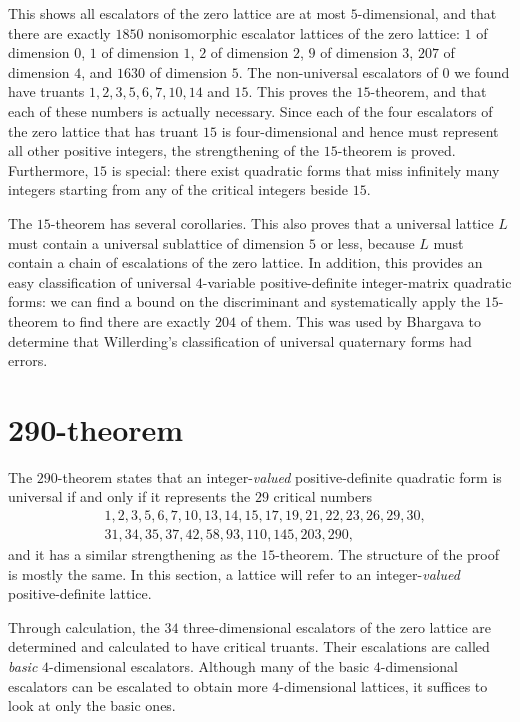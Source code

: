 \documentclass{article}
\begin{document}
This shows all escalators of the zero lattice are at most $5$-dimensional, and that there are exactly $1850$ nonisomorphic escalator lattices of the zero lattice: $1$ of dimension $0$, $1$ of dimension $1$, $2$ of dimension $2$, $9$ of dimension $3$, $207$ of dimension $4$, and $1630$ of dimension $5$. The non-universal escalators of $0$ we found have truants $1, 2, 3, 5, 6, 7, 10, 14$ and $15$. This proves the $15$-theorem, and that each of these numbers is actually necessary. Since each of the four escalators of the zero lattice that has truant $15$ is four-dimensional and hence must represent all other positive integers, the strengthening of the $15$-theorem is proved. Furthermore, $15$ is special: there exist quadratic forms that miss infinitely many integers starting from any of the critical integers beside $15$.

The $15$-theorem has several corollaries. This also proves that a universal lattice $L$ must contain a universal sublattice of dimension $5$ or less, because $L$ must contain a chain of escalations of the zero lattice. In addition, this provides an easy classification of universal $4$-variable positive-definite integer-matrix quadratic forms: we can find a bound on the discriminant and systematically apply the $15$-theorem to find there are exactly $204$ of them. This was used by Bhargava to determine that Willerding's classification of universal quaternary forms had errors.

\section{290-theorem}
The $290$-theorem \cite{twoninety} states that an integer-\emph{valued} positive-definite quadratic form is universal if and only if it represents the $29$ critical numbers
\[\begin{split}
    &1,2,3,5,6,7,10,13,14,15,17,19,21,22,23,26,29,30, \\
    &31,34,35,37,42,58,93,110,145,203,290,
\end{split}\] %
and it has a similar strengthening as the $15$-theorem.
The structure of the proof is mostly the same.
In this section, a lattice will refer to an integer-\emph{valued} positive-definite lattice.

Through calculation, the $34$ three-dimensional escalators of the zero lattice are determined and calculated to have critical truants.
Their escalations are called \emph{basic} $4$-dimensional escalators. Although many of the basic $4$-dimensional escalators can be escalated to obtain more $4$-dimensional lattices, it suffices to look at only the basic ones.
\end{document}
